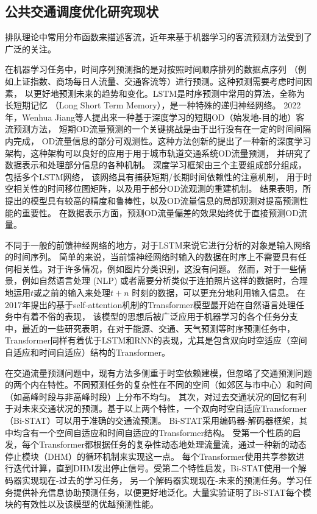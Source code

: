 \subsection{公共交通调度优化研究现状}
排队理论中常用分布函数来描述客流，近年来基于机器学习的客流预测方法受到了广泛的关注。

在机器学习任务中，时间序列预测指的是对按照时间顺序排列的数据点序列
（例如上证指数、商场每日人流量、交通客流等）进行预测。这种预测需要考虑时间因素，
以更好地预测未来的趋势和变化。LSTM是时序预测中常用的算法，全称为长短期记忆
（Long Short Term Memory），是一种特殊的递归神经网络\cite{6795963}。
2022年，Wenhua Jiang等人提出来一种基于深度学习的短期OD（始发地-目的地）客流预测方法\cite{DLOD2022}，
短期OD流量预测的一个关键挑战是由于出行没有在一定的时间间隔内完成，
OD流量信息的部分可观测性。这种方法创新的提出了一种新的深度学习架构，这种架构可以良好的应用于用于城市轨道交通系统OD流量预测，
并研究了数据表示和处理部分信息的各种机制。
深度学习框架由三个主要组成部分组成，包括多个LSTM网络，
该网络具有捕获短期/长期时间依赖性的注意机制，
用于时空相关性的时间移位图矩阵，以及用于部分OD流观测的重建机制。
结果表明，所提出的模型具有较高的精度和鲁棒性，以及OD流量信息的局部观测对提高预测性能的重要性。
在数据表示方面，预测OD流量偏差的效果始终优于直接预测OD流量。


不同于一般的前馈神经网络的地方，对于LSTM来说它进行分析的对象是输入网络的时间序列。
简单的来说，当前馈神经网络时输入的数据在时序上不需要具有任何相关性。对于许多情况，例如图片分类识别，这没有问题。
然而，对于一些情景，例如自然语言处理 (NLP) 或者需要分析类似于连拍照片这样的数据时，合理地运用$t$或之前的输入来处理$t+n$
时刻的数据，可以更充分地利用输入信息。
在2017年提出的基于self-attention机制的Transformer模型\cite{vaswani2017attention}最开始在自然语言处理任务中有着不俗的表现，
该模型的思想后被广泛应用于机器学习的各个任务分支中，最近的一些研究表明，在对于能源、交通、天气预测等时序预测任务中，
Transformer同样有着优于LSTM和RNN的表现，尤其是包含双向时空适应（空间自适应和时间自适应）结构的Transformer\cite{transformer2022,9810964}。

在交通流量预测问题中，现有方法多侧重于时空依赖建模，但忽略了交通预测问题的两个内在特性。不同预测任务的复杂性在不同的空间（如郊区与市中心）和时间（如高峰时段与非高峰时段）上分布不均匀。
其次，对过去交通状况的回忆有利于对未来交通状况的预测。基于以上两个特性，一个双向时空自适应Transformer（Bi-STAT）可以用于准确的交通流预测。
Bi-STAT采用编码器-解码器框架，其中均含有一个空间自适应和时间自适应的Transformer结构。
受第一个性质的启发，每个Transformer都根据任务的复杂性动态地处理流量流，通过一种新的动态停止模块（DHM）的循环机制来实现这一点。
每个Transformer使用共享参数进行迭代计算，直到DHM发出停止信号。受第二个特性启发，Bi-STAT使用一个解码器实现现在-过去的学习任务，
另一个解码器实现现在-未来的预测任务。学习任务提供补充信息协助预测任务，以便更好地泛化。大量实验证明了Bi-STAT每个模块的有效性以及该模型的优越预测性能。


